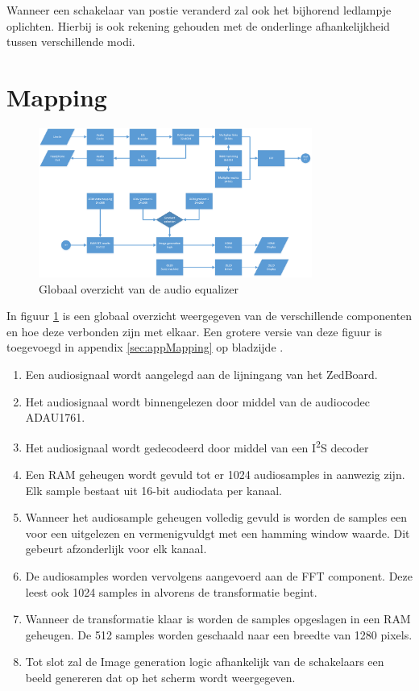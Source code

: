 	\par Wanneer een schakelaar van postie veranderd zal ook het bijhorend ledlampje oplichten. Hierbij is ook rekening gehouden met de onderlinge afhankelijkheid tussen verschillende modi. 


\section{Mapping}
	
	\begin{figure}[H]
		\centering
		\includegraphics[width=0.8\textwidth]{Chapters/GlobaalSchema/Images/Global.png}
		\caption{Globaal overzicht van de audio equalizer}
		\label{fig:globaal_overzicht}
	\end{figure}

	\par In figuur \ref{fig:globaal_overzicht} is een globaal overzicht weergegeven van de verschillende componenten en hoe deze verbonden zijn met elkaar. Een grotere versie van deze figuur is toegevoegd in appendix \ref{sec:appMapping} op bladzijde \pageref{sec:appMapping}.

		\begin{enumerate}
			\item Een audiosignaal wordt aangelegd aan de lijningang van het ZedBoard.
			\item Het audiosignaal wordt binnengelezen door middel van de audiocodec ADAU1761.
			\item Het audiosignaal wordt gedecodeerd door middel van een I\textsuperscript{2}S decoder
			\item Een RAM geheugen wordt gevuld tot er 1024 audiosamples in aanwezig zijn. Elk sample bestaat uit 16-bit audiodata per kanaal.
			\item Wanneer het audiosample geheugen volledig gevuld is worden de samples een voor een uitgelezen en vermenigvuldgt met een hamming window waarde. Dit gebeurt afzonderlijk voor elk kanaal. 
			\item De audiosamples worden vervolgens aangevoerd aan de FFT component. Deze leest ook 1024 samples in alvorens de transformatie begint.
			\item Wanneer de transformatie klaar is worden de samples opgeslagen in een RAM geheugen. De 512 samples worden geschaald naar een breedte van 1280 pixels. 
			\item Tot slot zal de Image generation logic afhankelijk van de schakelaars een beeld genereren dat op het scherm wordt weergegeven. 
		\end{enumerate}

